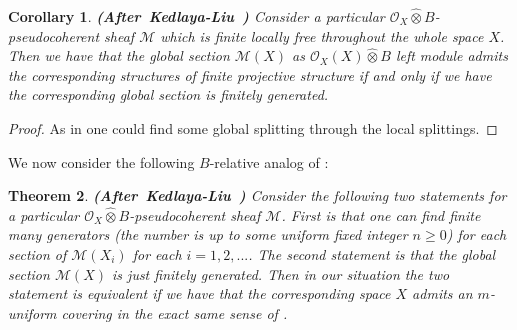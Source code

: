 \documentclass[12pt]{amsart}
\newtheorem{theorem}{Theorem}[section]
\newtheorem{corollary}[theorem]{Corollary}
\theoremstyle{definition}
\numberwithin{equation}{section}
\begin{document}
\begin{corollary}  \mbox{\bf{(After Kedlaya-Liu \cite[Corollary 2.6.8]{KL2})}}
Consider a particular $\mathcal{O}_X\widehat{\otimes}B$-pseudocoherent sheaf $\mathcal{M}$ which is finite locally free throughout the whole space $X$. Then we have that the global section $\mathcal{M}(X)$ as $\mathcal{O}_X(X)\widehat{\otimes}B$ left module admits the corresponding structures of finite projective structure if and only if we have the corresponding global section is finitely generated.
\end{corollary}

\begin{proof}
As in \cite[Corollary 2.6.8]{KL2} one could find some global splitting through the local splittings.
\end{proof}

\indent We now consider the following $B$-relative analog of \cite[Proposition 2.6.17]{KL2}:

\begin{theorem} \mbox{\bf{(After Kedlaya-Liu \cite[Proposition 2.6.17]{KL2})}} \label{theorem2.31}
Consider the following two statements for a particular $\mathcal{O}_X\widehat{\otimes}B$-pseudocoherent sheaf $\mathcal{M}$. First is that one can find finite many generators (the number is up to some uniform fixed integer $n\geq 0$) for each section of $\mathcal{M}(X_i)$ for each $i=1,2,...$. The second statement is that the global section $\mathcal{M}(X)$ is just finitely generated. Then in our situation the two statement is equivalent if we have that the corresponding space $X$ admits an $m$-uniform covering in the exact same sense of \cite[Proposition 2.6.17]{KL2}. 	
\end{theorem}
\end{document}
